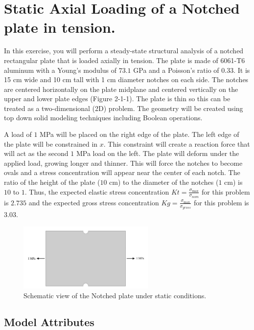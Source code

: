 \documentclass[letterpaper,pdftex]{article}
\begin{document}
\section{Static Axial Loading of a Notched plate in tension.}

In this exercise, you will perform a steady-state structural analysis of a notched rectangular plate that is loaded axially in tension. The plate is made of 6061-T6 aluminum with a Young’s modulus of $73.1$ GPa and a Poisson’s ratio of $0.33$. It is 15 cm wide and 10 cm tall with 1 cm diameter notches on each side. The notches are centered horizontally on the plate midplane and centered vertically on the upper and lower plate edges (Figure 2-1-1). The plate is thin so this can be treated as a two-dimensional (2D) problem. The geometry will be created using top down solid modeling techniques including Boolean operations.

A load of $1$ MPa will be placed on the right edge of the plate. The left edge of the plate will be constrained in $x$. This constraint will create a reaction force that will act as the second $1$ MPa load on the left. The plate will deform under the applied load, growing longer and thinner. This will force the notches to become ovals and a stress concentration will appear near the center of each notch.
The ratio of the height of the plate ($10$ cm) to the diameter of the notches ($1$ cm) is $10$ to $1$. Thus, the expected elastic stress concentration $Kt = \frac{\sigma_{\max}}{\sigma_{nom}}$ for this problem is $2.735$ and the expected gross stress concentration $Kg = \frac{\sigma_{\max}}{\sigma_{gross}}$ for this problem is $3.03$.

\begin{figure}[h]
   \centering
   \includegraphics[width=0.6\textwidth]{notchedplate}
   \caption{Schematic view of the Notched plate under static conditions.}
   \label{fig:notchedplate}
\end{figure}

\subsection{Model Attributes}
\end{document}
